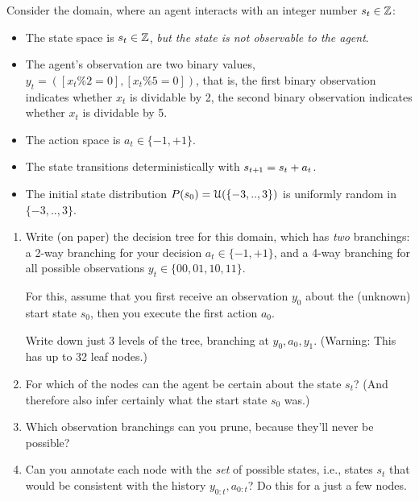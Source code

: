 

\renewcommand{\course}{Artificial Intelligence}
\renewcommand{\coursepicture}{course_ai}
\renewcommand{\coursedate}{Summer 2026}

\renewcommand{\exnum}{Exercise 4}

\exercises
\exercisestitle



Consider the domain, where an agent interacts with an integer number
$s_t \in{\mathbb{Z}}$:
\begin{itemize}
\item The state space is $s_t \in {\mathbb{Z}}$, \emph{but the state is not observable
  to the agent}.
\item The agent's observation are two binary values, $y_t = ([x_t \% 2=0],
  [x_t\%5 = 0])$, that is, the first binary observation indicates
  whether $x_t$ is dividable by 2, the second binary observation
  indicates whether $x_t$ is dividable by 5.
\item The action space is $a_t \in\{-1, +1\}$.
\item The state transitions deterministically with $s_{t{{\hspace*{-.0pt}\text{\rm +}\hspace*{-.5pt}}1}} = s_t + a_t$.
\item The initial state distribution $P(s_0) = {\cal U}(\{-3,..,3\})$
is uniformly random in $\{-3,..,3\}$.
\end{itemize}

\begin{enumerate}
\item Write (on paper) the decision tree for this domain, which has \emph{two} branchings: a 2-way branching for your decision $a_t\in\{-1,+1\}$, and a 4-way branching for all possible observations $y_t\in\{00,01,10,11\}$.

For this, assume that you first receive an observation $y_0$ about the (unknown) start state $s_0$, then you execute the first action $a_0$.

Write down just 3 levels of the tree, branching at $y_0,a_0,y_1$. (Warning: This has up to 32 leaf nodes.)

\item For which of the nodes can the agent be certain about the state $s_t$? (And therefore also infer certainly what the start state $s_0$ was.)

\item Which observation branchings can you prune, because they'll never be possible?

\item Can you annotate each node with the \emph{set} of possible states, i.e., states $s_t$ that would be consistent with the history $y_{0:t},a_{0:t}$? Do this for a just a few nodes.
\end{enumerate}


